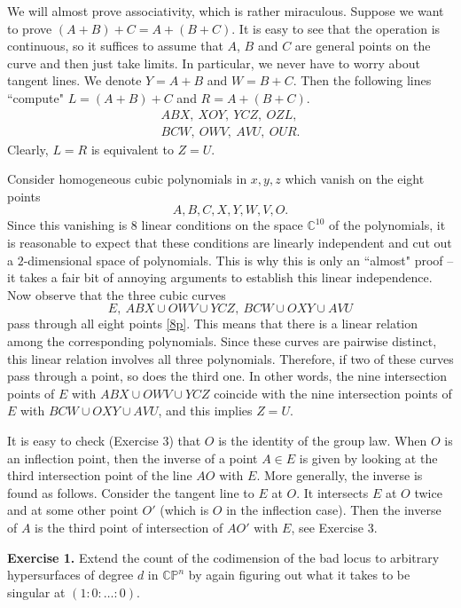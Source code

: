 \documentclass[11pt]{article}
\numberwithin{equation}{section}
\numberwithin{footnote}{section}
\newcommand{\blue}{\color{blue}}
\newcommand{\red}{\color{red}}
\renewcommand{\P}{{\mathbb P}}
\newcommand{\C}{{\mathbb C}}
\begin{document}
\smallskip
We will {\red almost} prove associativity, which is rather miraculous. Suppose we want to prove 
$(A+B)+C=A+(B+C)$.
It is easy to see that the operation is continuous, so it suffices to assume that $A$, $B$ and $C$ are general points on the curve and then just take limits. In particular, we never have to worry about tangent lines. We denote  $Y= A+B$ and $W = B+C$. Then the following lines ``compute" $L=(A+B)+C$ and
$R=A+(B+C)$. 
\begin{align*}
ABX,~XOY,~YCZ,~OZL,\\
BCW,~OWV,~AVU,~OUR.
\end{align*}
Clearly, $L=R$ is equivalent to $Z=U$. 

\smallskip
Consider homogeneous cubic polynomials in $x,y,z$ which vanish on the eight points
\begin{equation}\label{8p}
A,B,C,X,Y,W,V,O.
\end{equation}
Since this vanishing is $8$ linear conditions on the space $\C^{10}$ of the polynomials, it is reasonable to expect that these conditions are linearly independent and cut out a $2$-dimensional space of polynomials. {\blue This is why this is only an ``almost" proof -- it takes a fair bit of annoying arguments to establish this linear independence.} Now observe that the three cubic curves 
$$
E, ~ABX\cup OWV\cup YCZ,~BCW\cup OXY\cup AVU
$$
pass through all eight points \eqref{8p}. This means that there is a linear relation among the corresponding polynomials. Since these curves are pairwise distinct, this linear relation involves all three polynomials. Therefore, if two of these curves pass through a point, so does the third one. In other words, the nine intersection points of $E$ with $ABX\cup OWV\cup YCZ$ coincide with the nine intersection points of $E$ with $BCW\cup OXY\cup AVU$, and this implies $Z=U$.

\smallskip
It is easy to check (Exercise 3) that $O$ is the identity of the group law. When $O$ is an inflection point, then the inverse of a point $A\in E$ is given by looking at the third intersection point of the line $A O$ with $E$. More generally, the inverse is found as follows. Consider the tangent line to $E$ at $O$. It intersects $E$ at $O$ twice and at some other point $O'$ (which is $O$ in the inflection case). Then the inverse of $A$ is the third point of intersection of $AO'$ with $E$, see Exercise 3.

{\bf Exercise 1.} Extend the count of the codimension of the bad locus to arbitrary hypersurfaces of degree $d$ in $\C\P^n$ by again figuring out what it takes to be singular at $(1:0:\ldots:0)$.
\end{document}
